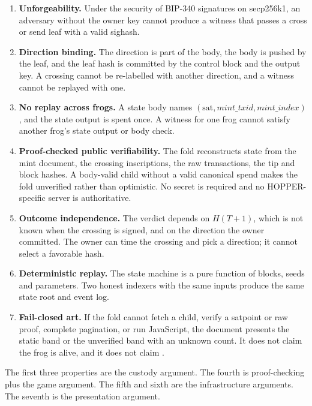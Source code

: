 \begin{enumerate}[leftmargin=1.7em,itemsep=0.35em]
  \item \textbf{Unforgeability.} Under the security of BIP-340 signatures on
        secp256k1, an adversary without the owner key cannot produce a
        witness that passes a cross or send leaf with a valid sighash.
  \item \textbf{Direction binding.} The direction is part of the body, the
        body is pushed by the leaf, and the leaf hash is committed by the
        control block and the output key. A crossing cannot be re-labelled
        with another direction, and a witness cannot be replayed with one.
  \item \textbf{No replay across frogs.} A state body names
        $(\mathrm{sat},\mathit{mint\_txid},\mathit{mint\_index})$, and the
        state output is spent once. A witness for one frog cannot satisfy
        another frog's state output or body check.
  \item \textbf{Proof-checked public verifiability.} The fold reconstructs
        state from the mint document, the crossing inscriptions, the raw
        transactions, the tip and block hashes. A body-valid child without a
        valid canonical spend makes the fold unverified rather than
        optimistic. No secret is required and no HOPPER-specific server is
        authoritative.
  \item \textbf{Outcome independence.} The verdict depends on $H(T+1)$, which
        is not known when the crossing is signed, and on the direction the
        owner committed. The owner can time the crossing and pick a
        direction; it cannot select a favorable hash.
  \item \textbf{Deterministic replay.} The state machine is a pure function
        of blocks, seeds and parameters. Two honest indexers with the same
        inputs produce the same state root and event log.
  \item \textbf{Fail-closed art.} If the fold cannot fetch a child, verify a
        satpoint or raw proof, complete pagination, or run JavaScript, the
        document presents the static band or the unverified band with an
        unknown count. It does not claim the frog is alive, and it does not
        claim .
\end{enumerate}

The first three properties are the custody argument. The fourth is
proof-checking plus the game argument. The fifth and sixth are the
infrastructure arguments. The seventh is the presentation argument.

